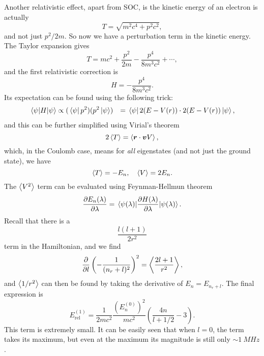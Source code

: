 \documentclass[hyperref, a4paper]{article}
\def\\{}%
\begin{document}
Another relativistic effect, apart from SOC, 
is the kinetic energy of an electron is actually 
\begin{equation}
    T = \sqrt{m^2 c^4 + p^2 c^2},
\end{equation}
and not just $p^2 / 2m$. 
So now we have a perturbation term in the kinetic energy.
The Taylor expansion gives 
\begin{equation}
    T = m c^2 + \frac{p^2}{2m} - \frac{p^4}{8 m^3 c^2} + \cdots,
\end{equation}
and the first relativistic correction is 
\begin{equation}
    H = - \frac{p^4}{8 m^3 c^2}.
\end{equation}
Its expectation can be found using the following trick:
\begin{equation}
    \begin{aligned}
        \expval*{H}{\psi} &\propto (\bra*{\psi} p^2) (p^2 \ket*{\psi}) \\
        &= \bra*{\psi} 2 (E - V(r)) \cdot 2 (E - V(r)) \ket*{\psi} ,
    \end{aligned}
\end{equation}
and this can be further simplified using Virial's theorem 
\begin{equation}
    2 \expval{T} = \expval{\vb*{r} \cdot \vb*{v} V},
\end{equation}
which, in the Coulomb case, means for \emph{all} eigenstates 
(and not just the ground state), we have 
\begin{equation}
    \expval{T} = - E_n, \quad \expval{V} = 2 E_n.
\end{equation}
The $\expval{V^2}$ term can be evaluated using Feynman-Hellmun theorem
\begin{equation}
    \pdv{E_n(\lambda)}{\lambda} = \expval{\pdv{H(\lambda)}{\lambda}}{\psi(\lambda)}. 
\end{equation}
Recall that there is a 
\[
    \frac{l (l + 1)}{2 r^2}
\]
term in the Hamiltonian, 
and we find 
\begin{equation}
    \pdv{l} \left( - \frac{1}{(n_r + l)^2} \right)^2 = \expval{\frac{2l + 1}{r^2}},
\end{equation} 
and $\expval{1 / r^2}$ can then be found by taking the derivative of $E_{n} = E_{n_r + l}$.
The final expression is 
\begin{equation}
    E^{(1)}_{\text{rel}} = \frac{1}{2 m c^2} \frac{(E_n^{(0)})^2}{mc^2} \left(
        \frac{4n}{l+1/2} - 3
    \right).
\end{equation}
This term is extremely small. 
It can be easily seen that when $l = 0$, 
the term takes its maximum,
but even at the maximum its magnitude is still only 
$\sim \SI{1}{MHz}$.
\end{document}
